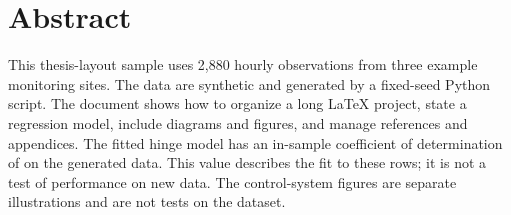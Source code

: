 \chapter*{Abstract}
This thesis-layout sample uses 2,880 hourly observations from three example monitoring sites. The data are synthetic and generated by a fixed-seed Python script. The document shows how to organize a long LaTeX project, state a regression model, include diagrams and figures, and manage references and appendices. The fitted hinge model has an in-sample coefficient of determination of \hingeRtwo{} on the generated data. This value describes the fit to these rows; it is not a test of performance on new data. The control-system figures are separate illustrations and are not tests on the dataset.
\clearpage
